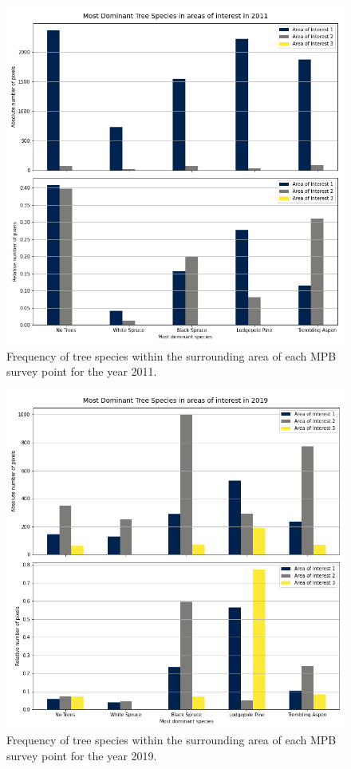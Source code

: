 \documentclass[
]{article}
\begin{document}
\begin{figure}

{\centering \includegraphics[width=0.8\linewidth]{../graphics/freq_species_11} 

}

\caption{Frequency of tree species within the surrounding area of each MPB survey point for the year 2011.}\label{fig:freqSpecies11}
\end{figure}
\begin{figure}

{\centering \includegraphics[width=0.8\linewidth]{../graphics/freq_species_19} 

}

\caption{Frequency of tree species within the surrounding area of each MPB survey point for the year 2019.}\label{fig:freqSpecies19}
\end{figure}
\end{document}
